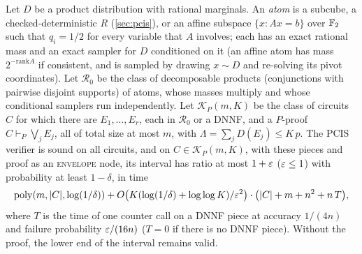 \begin{theorem}\label{thm:certenv}
Let $D$ be a product distribution with rational marginals. An \emph{atom} is a
subcube, a checked-deterministic $R$ (\cref{sec:pcis}), or an affine subspace
$\{x:Ax=b\}$ over $\mathbb{F}_2$ such that $q_i=1/2$ for every variable that $A$
involves; each has an exact rational mass and an exact sampler for $D$
conditioned on it (an affine atom has mass $2^{-\mathrm{rank}A}$ if consistent, and
is sampled by drawing $x\sim D$ and re-solving its pivot coordinates). Let $\mathcal R_0$ be
the class of decomposable products (conjunctions with pairwise disjoint
supports) of atoms, whose masses multiply and whose conditional samplers run
independently. Let $\mathcal K_P(m,K)$ be the class of circuits $C$ for which
there are $E_1,\dots,E_r$, each in $\mathcal R_0$ or a DNNF, and a $P$-proof
$C\vdash_P\bigvee_jE_j$, all of total size at most $m$, with
$\Lambda=\sum_jD(E_j)\le K\,p$. The PCIS verifier is sound on all circuits, and on
$C\in\mathcal K_P(m,K)$, with these pieces and proof as an \textup{\textsc{envelope}}
node, its interval has ratio at most $1+\varepsilon$ ($\varepsilon\le1$) with probability at
least $1-\delta$, in time
\[
\mathrm{poly}(m,|C|,\log(1/\delta))+O\big(K(\log(1/\delta)+\log\log K)/\varepsilon^2\big)\cdot\big(|C|+m+n^2+n\,T\big),
\]
where $T$ is the time of one counter call on a DNNF piece at accuracy $1/(4n)$ and
failure probability $\varepsilon/(16n)$ ($T=0$ if there is no DNNF piece). Without the
proof, the lower end of the interval remains valid.
\end{theorem}

